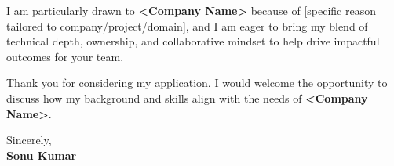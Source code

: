 \documentclass[11pt,a4paper]{article}
\newcommand{\Company}{<Company Name>}
\begin{document}
I am particularly drawn to \textbf{\Company} because of [specific reason tailored to company/project/domain], and I am eager to bring my blend of technical depth, ownership, and collaborative mindset to help drive impactful outcomes for your team.  

Thank you for considering my application. I would welcome the opportunity to discuss how my background and skills align with the needs of \textbf{\Company}.  

\vspace{0.7cm}
\noindent Sincerely, \\
\textbf{Sonu Kumar}  
\end{document}
